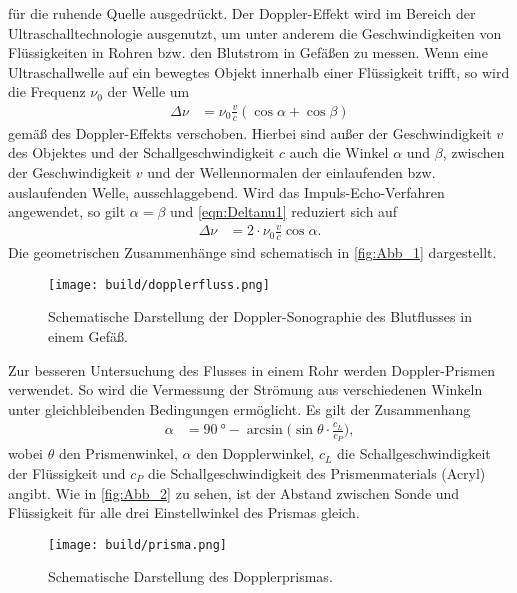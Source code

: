für die ruhende Quelle ausgedrückt.
Der Doppler-Effekt wird im Bereich der Ultraschalltechnologie ausgenutzt, um unter anderem die Geschwindigkeiten von Flüssigkeiten
in Rohren bzw. den Blutstrom in Gefäßen zu messen.
Wenn eine Ultraschallwelle auf ein bewegtes Objekt innerhalb einer Flüssigkeit trifft, so wird die Frequenz $\nu_0$ der Welle um 
\begin{align}
    \Delta \nu &= \nu_0 \frac{v}{c}(\cos{\alpha}+\cos{\beta})\label{eqn:Deltanu1}
\end{align}
gemäß des Doppler-Effekts verschoben. Hierbei sind außer der Geschwindigkeit $v$ des Objektes und der Schallgeschwindigkeit $c$ auch
die Winkel $\alpha$ und $\beta$, zwischen der Geschwindigkeit $v$ und der Wellennormalen der einlaufenden bzw. auslaufenden Welle,
ausschlaggebend.
Wird das Impuls-Echo-Verfahren angewendet, so gilt $\alpha = \beta$ und \autoref{eqn:Deltanu1} reduziert sich auf
\begin{align}
    \Delta \nu &= 2\cdot \nu_0 \frac{v}{c}\cos{\alpha}.\label{eqn:Deltanu}
\end{align}
Die geometrischen Zusammenhänge sind schematisch in \autoref{fig:Abb_1} dargestellt.
\begin{figure}[H]
    \centering
     \texttt{[image: build/dopplerfluss.png]}
    \caption{Schematische Darstellung der Doppler-Sonographie des Blutflusses in einem Gefäß.\cite{VUS3}}
    \label{fig:Abb_1}
\end{figure}

Zur besseren Untersuchung des Flusses in einem Rohr werden Doppler-Prismen verwendet.
So wird die Vermessung der Strömung aus verschiedenen Winkeln unter gleichbleibenden Bedingungen ermöglicht.
Es gilt der Zusammenhang
\begin{align}
    \alpha &= \qty{90}{\degree} - \arcsin{\bigl( \sin{\theta} \cdot \frac{c_L}{c_P}\bigr)},\label{eqn:alpha}
\end{align}
wobei $\theta$ den Prismenwinkel, $\alpha$ den Dopplerwinkel, $c_L$ die Schallgeschwindigkeit der Flüssigkeit und 
$c_P$ die Schallgeschwindigkeit des Prismenmaterials (Acryl) angibt.
Wie in \autoref{fig:Abb_2} zu sehen, ist der Abstand zwischen Sonde und Flüssigkeit
für alle drei Einstellwinkel des Prismas gleich.
\begin{figure}[H]
    \centering
     \texttt{[image: build/prisma.png]}
    \caption{Schematische Darstellung des Dopplerprismas.\cite{VUS3}}
    \label{fig:Abb_2}
\end{figure}
